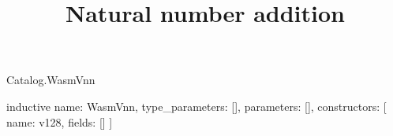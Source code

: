 \begin{lexlean}{Catalog.WasmVnn}
\title{Natural number addition}
\begin{semanticmodule}
inductive{
  name: WasmVnn,
  type_parameters: [],
  parameters: [],
  constructors: [
    {name: v128, fields: []}
  ]
}
\end{semanticmodule}
\end{lexlean}
